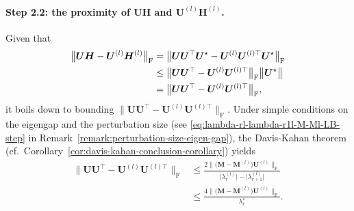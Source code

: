 %




\paragraph{Step 2.2: the proximity of $\bm{U}\bm{H}$ and $\bm{U}^{(l)}\bm{H}^{(l)}$.}
Given that
%
\begin{align}
	\big\|\bm{U}\bm{H}-\bm{U}^{(l)}\bm{H}^{(l)}\big\|_{\mathrm{F}}
	& =\big\|\bm{U}\bm{U}^{\top}\bm{U}^{\star}-\bm{U}^{(l)}\bm{U}^{(l)\top}\bm{U}^{\star}\big\|_{\mathrm{F}} \notag\\
 	& \leq\big\|\bm{U}\bm{U}^{\top}-\bm{U}^{(l)}\bm{U}^{(l)\top}\big\|_{\mathrm{F}} \big\|\bm{U}^{\star}\big\| \notag\\
 	& =\big\|\bm{U}\bm{U}^{\top}-\bm{U}^{(l)}\bm{U}^{(l)\top}\big\|_{\mathrm{F}},
	\label{eq:UU-UlUl-UB01}
\end{align}
%
it boils down to bounding $\|\bm{U}\bm{U}^{\top}-\bm{U}^{(l)}\bm{U}^{(l)\top}\|_{\mathrm{F}}$.
Under simple conditions on the eigengap and the perturbation size (see \eqref{eq:lambda-rl-lambda-r1l-M-Ml-LB-step}  in Remark~\ref{remark:perturbation-size-eigen-gap}),  the Davis-Kahan theorem (cf.~Corollary~\ref{cor:davis-kahan-conclusion-corollary}) yields
%
\begin{align}
	\big\|\bm{U}\bm{U}^{\top}-\bm{U}^{(l)}\bm{U}^{(l)\top}\big\|_{\mathrm{F}}
	& \leq\frac{2\big\|\big(\bm{M}-\bm{M}^{(l)}\big)\bm{U}^{(l)}\big\|_{\mathrm{F}} }{ \big| \lambda_{r}^{(l)} \big| - \big|\lambda_{r+1}^{(l)} \big|} \nonumber\\
	& \leq\frac{4\big\|\big(\bm{M}-\bm{M}^{(l)}\big)\bm{U}^{(l)}\big\|_{\mathrm{F}} }{\lambda_{r}^{\star}}.
	\label{eq:UU-UlUl-UB1}
\end{align}
%



